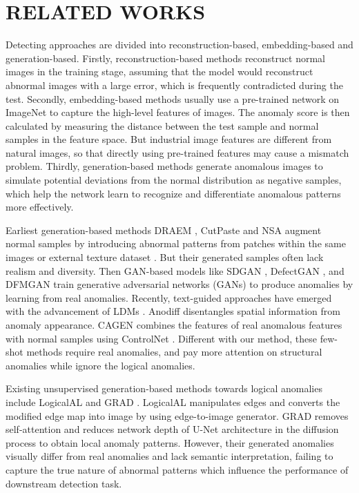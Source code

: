 \section{RELATED WORKS}
Detecting approaches are divided into reconstruction-based, embedding-based and generation-based. Firstly, reconstruction-based methods \cite{zavrtanik2021draem,zavrtanik2021reconstruction} reconstruct normal images in the training stage, assuming that the model would reconstruct abnormal images with a large error, which is frequently contradicted during the test. Secondly, embedding-based methods \cite{ liu2023simplenet,zhang2023destseg,deng2022anomaly,roth2022towards} usually use a pre-trained network on ImageNet \cite{deng2009imagenet} to capture the high-level features of images. The anomaly score is then calculated by measuring the distance between the test sample and normal samples in the feature space. But industrial image features are different from natural images, so that directly using pre-trained features may cause a mismatch problem. Thirdly, generation-based methods \cite{niu2020defect,zhang2021defect,duan2023few,hu2024anomalydiffusion,jiang2024cagen} generate anomalous images to simulate potential deviations from the normal distribution as negative samples, which help the network learn to recognize and differentiate anomalous patterns more effectively.

Earliest generation-based methods DRAEM \cite{zavrtanik2021draem}, CutPaste \cite{li2021cutpaste} and NSA  \cite{schluter2022natural} augment normal samples by introducing abnormal patterns from patches within the same images or external texture dataset \cite{dtd2014accuracy}. But their generated samples often lack realism and diversity. Then GAN-based models like SDGAN \cite{niu2020defect}, DefectGAN \cite{zhang2021defect}, and DFMGAN \cite{duan2023few} train generative adversarial networks (GANs) \cite{goodfellow2020generative}  to produce anomalies by learning from real anomalies. Recently, text-guided approaches have emerged with the advancement of LDMs \cite{rombach2022high}. Anodiff \cite{hu2024anomalydiffusion} disentangles spatial information from anomaly appearance. CAGEN \cite{jiang2024cagen} combines the features of real anomalous features with normal samples using ControlNet \cite{zhang2023adding}.  Different with our method, these few-shot methods require real anomalies, and pay more attention on structural anomalies while ignore the logical anomalies.

Existing unsupervised generation-based methods towards logical anomalies include LogicalAL \cite{zhao2024logical} and GRAD \cite{dai2024generating}. LogicalAL manipulates edges and converts the modified edge map into image by using edge-to-image generator. GRAD removes self-attention and reduces network depth of U-Net architecture in the diffusion process to obtain local anomaly patterns. However, their generated anomalies visually differ from real anomalies and lack semantic interpretation, failing to capture the true nature of abnormal patterns which influence the performance of downstream detection task.

